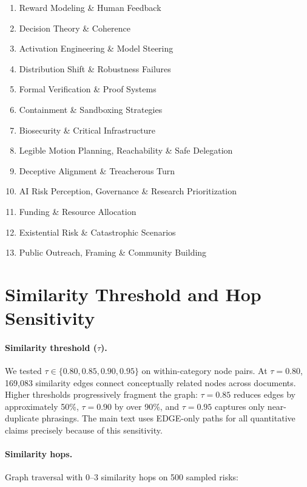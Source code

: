 \documentclass[10pt,twocolumn,letterpaper]{article}
\begin{document}
\begin{small}
\begin{enumerate}
\item[27.] Reward Modeling \& Human Feedback
\item[28.] Decision Theory \& Coherence
\item[29.] Activation Engineering \& Model Steering
\item[30.] Distribution Shift \& Robustness Failures
\item[31.] Formal Verification \& Proof Systems
\item[32.] Containment \& Sandboxing Strategies
\item[33.] Biosecurity \& Critical Infrastructure
\item[34.] Legible Motion Planning, Reachability \& Safe Delegation
\item[35.] Deceptive Alignment \& Treacherous Turn
\item[36.] AI Risk Perception, Governance \& Research Prioritization
\item[37.] Funding \& Resource Allocation
\item[38.] Existential Risk \& Catastrophic Scenarios
\item[39.] Public Outreach, Framing \& Community Building
\end{enumerate}
\end{small}

\section{Similarity Threshold and Hop Sensitivity}
\label{app:sensitivity}

\paragraph{Similarity threshold ($\tau$).}
We tested $\tau \in \{0.80, 0.85, 0.90, 0.95\}$ on within-category node pairs.
At $\tau{=}0.80$, 169{,}083 similarity edges connect conceptually related nodes
across documents. Higher thresholds progressively fragment the graph:
$\tau{=}0.85$ reduces edges by approximately 50\%, $\tau{=}0.90$ by over 90\%,
and $\tau{=}0.95$ captures only near-duplicate phrasings. The main text uses
EDGE-only paths for all quantitative claims precisely because of this
sensitivity.

\paragraph{Similarity hops.}
Graph traversal with 0--3 similarity hops on 500 sampled risks:
\end{document}
